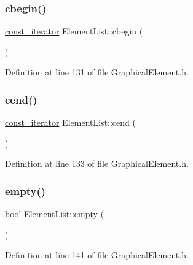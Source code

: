 \subsubsection{\texorpdfstring{cbegin()}{cbegin()}}
{\footnotesize\ttfamily \hyperlink{class_element_list_a4323074a8e979322c0bf1eed5c892cf4}{const\+\_\+iterator} Element\+List\+::cbegin (\begin{DoxyParamCaption}{ }\end{DoxyParamCaption})\hspace{0.3cm}{\ttfamily [inline]}}



Definition at line 131 of file Graphical\+Element.\+h.

\mbox{\label{class_element_list_a67ed451811a28e5d94edd286b8a1f245}} 
\subsubsection{\texorpdfstring{cend()}{cend()}}
{\footnotesize\ttfamily \hyperlink{class_element_list_a4323074a8e979322c0bf1eed5c892cf4}{const\+\_\+iterator} Element\+List\+::cend (\begin{DoxyParamCaption}{ }\end{DoxyParamCaption})\hspace{0.3cm}{\ttfamily [inline]}}



Definition at line 133 of file Graphical\+Element.\+h.

\mbox{\label{class_element_list_aff93ee82e54aa171e792b0a86cafd08a}} 
\subsubsection{\texorpdfstring{empty()}{empty()}}
{\footnotesize\ttfamily bool Element\+List\+::empty (\begin{DoxyParamCaption}{ }\end{DoxyParamCaption})\hspace{0.3cm}{\ttfamily [inline]}}



Definition at line 141 of file Graphical\+Element.\+h.

